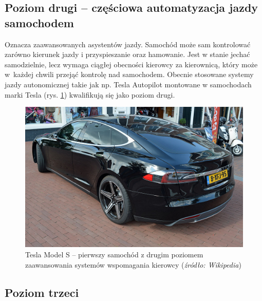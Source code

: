 \subsection{Poziom drugi -- częściowa automatyzacja jazdy samochodem}
Oznacza zaawansowanych asystentów jazdy. %
Samochód może sam kontrolować zarówno kierunek jazdy i przyspieszanie oraz hamowanie. %
Jest w stanie jechać samodzielnie, lecz wymaga ciągłej obecności kierowcy za kierownicą, który może w~każdej chwili przejąć kontrolę nad samochodem. 
Obecnie stosowane systemy jazdy autonomicznej takie jak np. Tesla Autopilot montowane w samochodach marki Tesla (rys. \ref{fig:teslas}) kwalifikują się jako poziom drugi.

\begin{figure}
  \centering
  \includegraphics[width=12cm]{img/tesla.jpg}
  \caption{Tesla Model S -- pierwszy samochód z drugim poziomem zaawansowania systemów wspomagania kierowcy (\textit{źródło: Wikipedia})}
  \label{fig:teslas}
\end{figure}

\subsection{Poziom trzeci}


